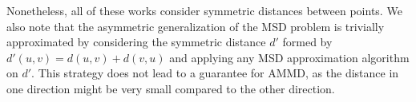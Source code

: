 Nonetheless, all of these works consider symmetric distances between points. We also note that the asymmetric generalization of the MSD problem is trivially approximated by considering the symmetric distance $d'$ formed by $d'(u,v) = d(u,v)+d(v,u)$ and applying any MSD approximation algorithm on $d'$. This strategy does not lead to a guarantee for AMMD, as the distance in one direction might be very small compared to the other direction.
